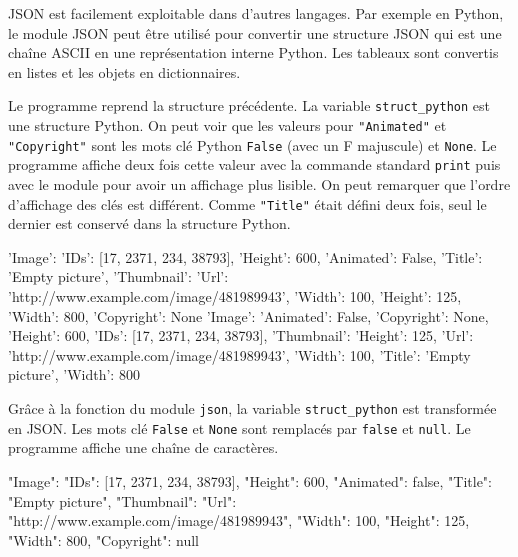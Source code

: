 JSON est facilement exploitable dans d’autres langages. Par exemple en Python, le module JSON peut être utilisé pour convertir une structure JSON qui est une chaîne ASCII en une représentation interne Python. Les tableaux sont convertis en listes et les objets en dictionnaires.

     \vspace{1em}

Le programme  reprend la structure précédente. La variable \texttt{struct\_python} est une structure Python. On peut voir que les valeurs pour \texttt{"Animated"} et \texttt{"Copyright"} sont les mots clé Python \texttt{False} (avec un F majuscule) et \texttt{None}. Le programme affiche deux fois cette valeur avec la commande standard \texttt{print} puis avec le module  pour avoir un affichage plus lisible. On peut remarquer que l'ordre d'affichage des clés est différent. Comme \texttt{"Title"} était défini deux fois, seul le dernier est conservé dans la structure Python.

\begin{termc}[backgroundcolor=\color{gray!10}, language=json, basicstyle=\tiny]
{'Image': {'IDs': [17, 2371, 234, 38793], 'Height': 600, 'Animated': False, 'Title': 'Empty picture', 'Thumbnail': 
{'Url': 'http://www.example.com/image/481989943', 'Width': 100, 'Height': 125}, 'Width': 800, 'Copyright': None}}
{'Image': {'Animated': False,
           'Copyright': None,
           'Height': 600,
           'IDs': [17, 2371, 234, 38793],
           'Thumbnail': {'Height': 125,
                         'Url': 'http://www.example.com/image/481989943',
                         'Width': 100},
           'Title': 'Empty picture',
           'Width': 800}}
\end{termc}

Grâce à la fonction  du module \texttt{json}, la variable \texttt{struct\_python} est transformée en JSON. Les mots clé  \texttt{False} et  \texttt{None} sont remplacés par  \texttt{false} et  \texttt{null}. Le programme affiche une chaîne de caractères.

\begin{termc}[backgroundcolor=\color{gray!10}, language=json, basicstyle=\tiny]
{"Image": {"IDs": [17, 2371, 234, 38793], "Height": 600, "Animated": false, "Title": "Empty picture", "Thumbnail": 
{"Url": "http://www.example.com/image/481989943", "Width": 100, "Height": 125}, "Width": 800, "Copyright": null}}
\end{termc}

